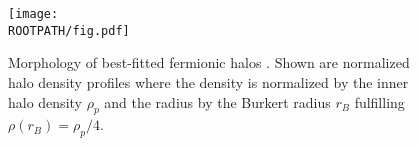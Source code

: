\begin{figure}%
	\centering%
	\texttt{[image: \\ROOTPATH/fig.pdf]}%
	\caption{Morphology of best-fitted fermionic halos .  Shown are normalized halo density profiles where the density is normalized by the inner halo density $\rho_p$ and the radius by the Burkert radius $r_B$ fulfilling $\rho(r_B) = \rho_p/4$.}%
\label{fig:halo-profiles}
\end{figure}